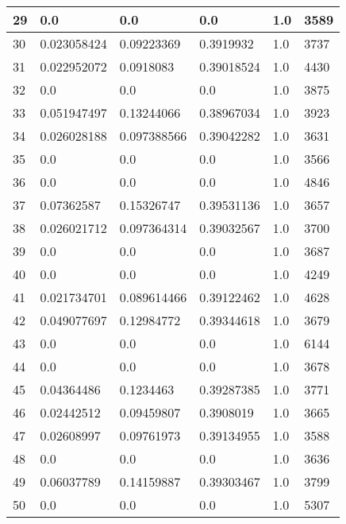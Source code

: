 \begin{longtable}{|l|l|l|l|l|l|}
29 & 0.0 & 0.0 & 0.0 & 1.0 & 3589 \\ \hline 
30 & 0.023058424 & 0.09223369 & 0.3919932 & 1.0 & 3737 \\ \hline 
31 & 0.022952072 & 0.0918083 & 0.39018524 & 1.0 & 4430 \\ \hline 
32 & 0.0 & 0.0 & 0.0 & 1.0 & 3875 \\ \hline 
33 & 0.051947497 & 0.13244066 & 0.38967034 & 1.0 & 3923 \\ \hline 
34 & 0.026028188 & 0.097388566 & 0.39042282 & 1.0 & 3631 \\ \hline 
35 & 0.0 & 0.0 & 0.0 & 1.0 & 3566 \\ \hline 
36 & 0.0 & 0.0 & 0.0 & 1.0 & 4846 \\ \hline 
37 & 0.07362587 & 0.15326747 & 0.39531136 & 1.0 & 3657 \\ \hline 
38 & 0.026021712 & 0.097364314 & 0.39032567 & 1.0 & 3700 \\ \hline 
39 & 0.0 & 0.0 & 0.0 & 1.0 & 3687 \\ \hline 
40 & 0.0 & 0.0 & 0.0 & 1.0 & 4249 \\ \hline 
41 & 0.021734701 & 0.089614466 & 0.39122462 & 1.0 & 4628 \\ \hline 
42 & 0.049077697 & 0.12984772 & 0.39344618 & 1.0 & 3679 \\ \hline 
43 & 0.0 & 0.0 & 0.0 & 1.0 & 6144 \\ \hline 
44 & 0.0 & 0.0 & 0.0 & 1.0 & 3678 \\ \hline 
45 & 0.04364486 & 0.1234463 & 0.39287385 & 1.0 & 3771 \\ \hline 
46 & 0.02442512 & 0.09459807 & 0.3908019 & 1.0 & 3665 \\ \hline 
47 & 0.02608997 & 0.09761973 & 0.39134955 & 1.0 & 3588 \\ \hline 
48 & 0.0 & 0.0 & 0.0 & 1.0 & 3636 \\ \hline 
49 & 0.06037789 & 0.14159887 & 0.39303467 & 1.0 & 3799 \\ \hline 
50 & 0.0 & 0.0 & 0.0 & 1.0 & 5307 \\ \hline 
\end{longtable}